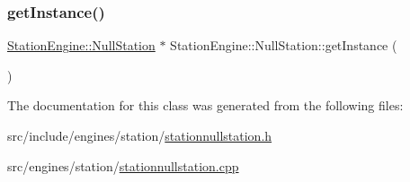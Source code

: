 \subsubsection{\texorpdfstring{getInstance()}{getInstance()}}
{\footnotesize\ttfamily \mbox{\hyperlink{classQRail_1_1StationEngine_1_1NullStation}{Station\+Engine\+::\+Null\+Station}} $\ast$ Station\+Engine\+::\+Null\+Station\+::get\+Instance (\begin{DoxyParamCaption}{ }\end{DoxyParamCaption})\hspace{0.3cm}{\ttfamily [static]}}



The documentation for this class was generated from the following files\+:\begin{DoxyCompactItemize}
\item 
src/include/engines/station/\mbox{\hyperlink{stationnullstation_8h}{stationnullstation.\+h}}\item 
src/engines/station/\mbox{\hyperlink{stationnullstation_8cpp}{stationnullstation.\+cpp}}\end{DoxyCompactItemize}
